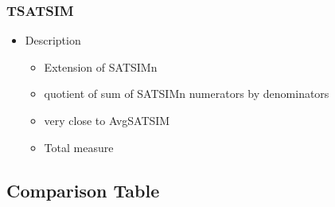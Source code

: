 \documentclass{article}
\begin{document}
\subsubsection{TSATSIM}
\label{sec-6-9-4}
\begin{itemize}

\item Description
\label{sec-6-9-4-1}%
\begin{itemize}
\item Extension of SATSIMn
\item quotient of sum of SATSIMn numerators by denominators
\item very close to AvgSATSIM
\item Total measure
\end{itemize}
\end{itemize} %
\subsection{Comparison Table}
\label{sec-6-10}
\end{document}

